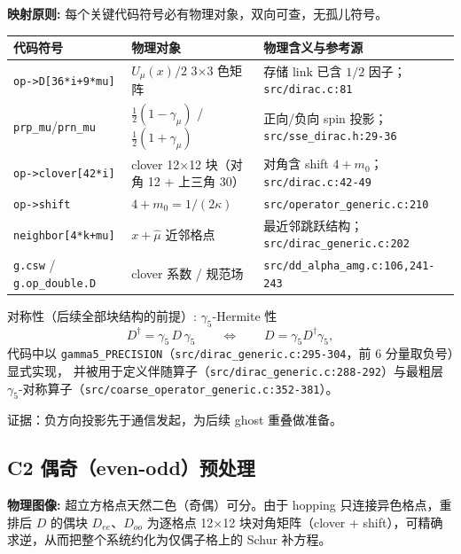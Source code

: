 \documentclass[UTF8]{ctexart}
\begin{document}
\begin{mapbox}
\textbf{映射原则:} 每个关键代码符号必有物理对象，双向可查，无孤儿符号。
\end{mapbox}
\begin{xltabular}{\textwidth}{llX}
\toprule
\textcolor{map}{代码符号} & 物理对象 & 物理含义与参考源 \\
\midrule
\endhead
\texttt{op->D[36*i+9*mu]} & $U_\mu(x)/2$ 3$\times$3 色矩阵 & 存储 link 已含 $1/2$ 因子；\texttt{\nolinkurl{src/dirac.c:81}} \\
\texttt{prp\_mu}/\texttt{prn\_mu} & $\frac12(1-\gamma_\mu)$ / $\frac12(1+\gamma_\mu)$ & 正向/负向 spin 投影；\texttt{\nolinkurl{src/sse_dirac.h:29-36}} \\
\texttt{op->clover[42*i]} & clover 12$\times$12 块（对角 12 + 上三角 30） & 对角含 shift $4+m_0$；\texttt{\nolinkurl{src/dirac.c:42-49}} \\
\texttt{op->shift} & $4+m_0=1/(2\kappa)$ & \texttt{\nolinkurl{src/operator_generic.c:210}} \\
\texttt{neighbor[4*k+mu]} & $x+\hat\mu$ 近邻格点 & 最近邻跳跃结构；\texttt{\nolinkurl{src/dirac_generic.c:202}} \\
\texttt{g.csw} / \texttt{g.op\_double.D} & clover 系数 / 规范场 & \texttt{\nolinkurl{src/dd_alpha_amg.c:106,241-243}} \\
\bottomrule
\end{xltabular}

\textcolor{phys}{对称性（后续全部块结构的前提）:} $\gamma_5$-Hermite 性
\begin{equation}\label{eq:g5herm}
D^\dagger = \gamma_5\, D\, \gamma_5 \qquad\Longleftrightarrow\qquad D=\gamma_5 D^\dagger \gamma_5 ,
\end{equation}
代码中以 \texttt{gamma5\_PRECISION}（\texttt{\nolinkurl{src/dirac_generic.c:295-304}}，前 6 分量取负号）显式实现，
并被用于定义伴随算子（\texttt{\nolinkurl{src/dirac_generic.c:288-292}}）与最粗层 $\gamma_5$-对称算子（\texttt{\nolinkurl{src/coarse_operator_generic.c:352-381}}）。


\vspace{2mm}\noindent\textcolor{evidence}{证据}：负方向投影先于通信发起，为后续 ghost 重叠做准备。

\subsection{C2 偶奇（even-odd）预处理}
\begin{physbox}
\textbf{物理图像:} 超立方格点天然二色（奇偶）可分。由于 hopping 只连接异色格点，重排后 $D$ 的偶块 $D_{ee}$、$D_{oo}$
为逐格点 12$\times$12 块对角矩阵（clover + shift），可精确求逆，从而把整个系统约化为仅偶子格上的 Schur 补方程。
\end{physbox}
\end{document}
